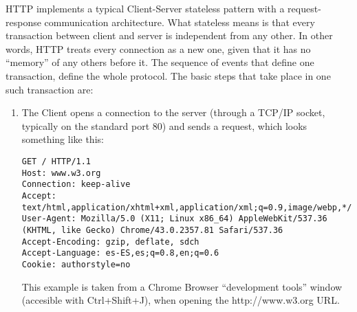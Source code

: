 HTTP implements a typical Client-Server stateless pattern with a request-response communication architecture. What
stateless means is that every transaction between client and server is independent from any other. In other words,
HTTP treats every connection as a new one, given that it has no ``memory'' of any others before it. The sequence of
events that define one transaction, define the whole protocol. The basic steps that take place in one such transaction
are:
\begin{enumerate}
\item The Client opens a connection to the server (through a TCP/IP socket, typically on the standard port 80) and
sends a request, which looks something like this:
\begin{verbatim}
GET / HTTP/1.1
Host: www.w3.org
Connection: keep-alive
Accept: text/html,application/xhtml+xml,application/xml;q=0.9,image/webp,*/*;q=0.8
User-Agent: Mozilla/5.0 (X11; Linux x86_64) AppleWebKit/537.36 (KHTML, like Gecko) Chrome/43.0.2357.81 Safari/537.36
Accept-Encoding: gzip, deflate, sdch
Accept-Language: es-ES,es;q=0.8,en;q=0.6
Cookie: authorstyle=no
\end{verbatim}
This example is taken from a Chrome Browser ``development tools'' window (accesible with Ctrl+Shift+J), when opening
the http://www.w3.org URL.\\


\end{enumerate}

